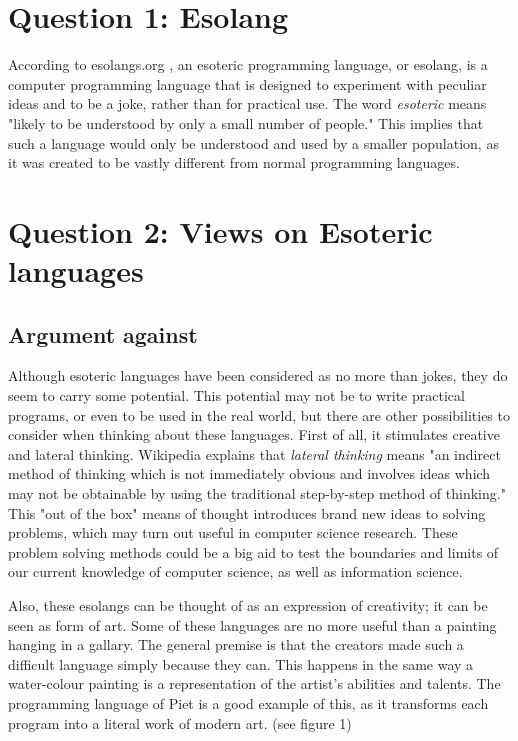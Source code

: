 \documentclass[a4paper]{article}
\begin{document}

\tableofcontents
\newpage

\section{Question 1: Esolang}
According to esolangs.org \cite{esolang}, an esoteric programming language, or esolang, is a computer programming language that is designed to experiment with peculiar ideas and to be a joke, rather than for practical use. The word \textit{esoteric} means "likely to be understood by only a small number of people\cite{wikipedia}." This implies that such a language would only be understood and used by a smaller population, as it was created to be vastly different from normal programming languages. 
\section{Question 2: Views on Esoteric languages}
	\subsection{Argument against}
	Although esoteric languages have been considered as no more than jokes, they do seem to carry some potential. This potential may not be to write practical programs, or even to be used in the real world, but there are other possibilities to consider when thinking about these languages. First of all, it stimulates creative and lateral thinking. Wikipedia\cite{wikipedia2} explains that \textit{lateral thinking} means "an indirect method of thinking which is not immediately obvious and involves ideas which may not be obtainable by using the traditional step-by-step method of thinking." This "out of the box" means of thought introduces brand new ideas to solving problems, which may turn out useful in computer science research. These problem solving methods could be a big aid to test the boundaries and limits of our current knowledge of computer science, as well as information science.
	
	Also, these esolangs can be thought of as an expression of creativity; it can be seen as form of art\cite{esolangArt}. Some of these languages are no more useful than a painting hanging in a gallary. The general premise is that the creators made such a difficult language simply because they can. This happens in the same way a water-colour painting is a representation of the artist's abilities and talents. The programming language of Piet is a good example of this, as it transforms each program into a literal work of modern art. (see figure 1)
	
\end{document}

